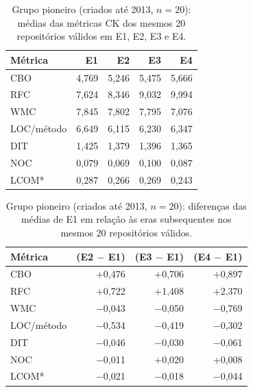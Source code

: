 \begin{table}[htbp]
\centering\footnotesize
\caption{Grupo pioneiro (criados até 2013, $n = 20$): médias das métricas CK dos mesmos 20 repositórios válidos em E1, E2, E3 e E4.}
\label{tab:valores_pioneiro}
\begin{tabular}{lrrrr}
\hline
\textbf{Métrica} & \textbf{E1} & \textbf{E2} & \textbf{E3} & \textbf{E4} \\ \hline
CBO & 4,769 & 5,246 & 5,475 & 5,666 \\
RFC & 7,624 & 8,346 & 9,032 & 9,994 \\
WMC & 7,845 & 7,802 & 7,795 & 7,076 \\
LOC/método & 6,649 & 6,115 & 6,230 & 6,347 \\
DIT & 1,425 & 1,379 & 1,396 & 1,365 \\
NOC & 0,079 & 0,069 & 0,100 & 0,087 \\
LCOM* & 0,287 & 0,266 & 0,269 & 0,243 \\
\hline
\end{tabular}
\par\vspace{2pt}{\footnotesize Fonte: Elaborada pelos autores (2026).}
\end{table}

\begin{table}[htbp]
\centering\footnotesize
\caption{Grupo pioneiro (criados até 2013, $n = 20$): diferenças das médias de E1 em relação às eras subsequentes nos mesmos 20 repositórios válidos.}
\label{tab:diferencas_pioneiro}
\begin{tabular}{lrrr}
\hline
\textbf{Métrica} & \textbf{(E2 $-$ E1)} & \textbf{(E3 $-$ E1)} & \textbf{(E4 $-$ E1)} \\ \hline
CBO & $+$0,476 & $+$0,706 & $+$0,897 \\
RFC & $+$0,722 & $+$1,408 & $+$2,370 \\
WMC & $-$0,043 & $-$0,050 & $-$0,769 \\
LOC/método & $-$0,534 & $-$0,419 & $-$0,302 \\
DIT & $-$0,046 & $-$0,030 & $-$0,061 \\
NOC & $-$0,011 & $+$0,020 & $+$0,008 \\
LCOM* & $-$0,021 & $-$0,018 & $-$0,044 \\
\hline
\end{tabular}
\par\vspace{2pt}{\footnotesize Fonte: Elaborada pelos autores (2026). Nota: diferenças calculadas antes do arredondamento.}
\end{table}

